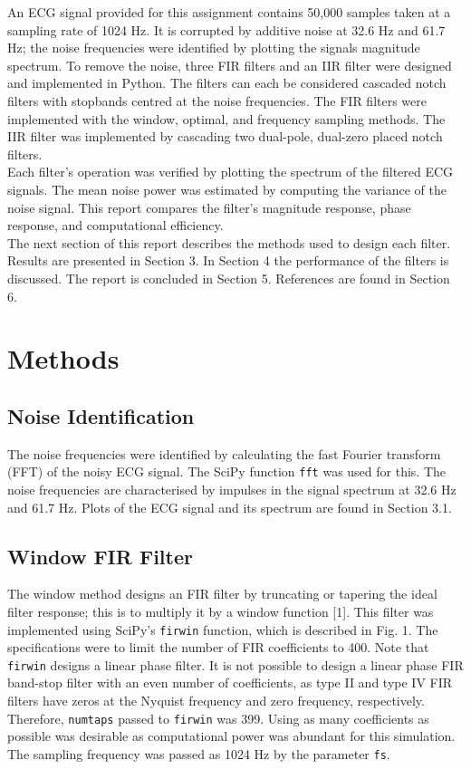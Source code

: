 \documentclass[12pt]{article}
\begin{document}
\noindent An ECG signal provided for this assignment contains 50,000 samples taken at a sampling rate of 1024 Hz. It is corrupted by additive noise
at 32.6 Hz and 61.7 Hz; the noise frequencies were identified by plotting the signals magnitude spectrum. To remove the noise, three FIR
filters and an IIR filter were designed and implemented in Python. The filters can each be considered cascaded notch filters with stopbands
centred at the noise frequencies. The FIR filters were implemented with the window, optimal, and frequency sampling methods. The IIR filter
was implemented by cascading two dual-pole, dual-zero placed notch filters.\\

\noindent Each filter’s operation was verified by plotting the spectrum of the filtered ECG signals. The mean noise power was estimated by computing
the variance of the noise signal. This report compares the filter’s magnitude response, phase response, and computational efficiency.\\

\noindent The next section of this report describes the methods used to design each filter. Results are presented in Section 3. In Section 4 the
performance of the filters is discussed. The report is concluded in Section 5. References are found in Section 6.

\section{Methods}

\subsection{Noise Identification}
The noise frequencies were identified by calculating the fast Fourier transform (FFT) of the noisy ECG signal. The SciPy function \texttt{fft}
was used for this. The noise frequencies are characterised by impulses in the signal spectrum at 32.6 Hz and 61.7 Hz. Plots of the ECG signal
and its spectrum are found in Section 3.1.

\subsection{Window FIR Filter}
The window method designs an FIR filter by truncating or tapering the ideal filter response; this is to multiply it by a window function [1].
This filter was implemented using SciPy’s \texttt{firwin} function, which is described in Fig. 1. The specifications were to limit the number of FIR
coefficients to 400. Note that \texttt{firwin} designs a linear phase filter. It is not possible to design a linear phase FIR band-stop filter with
an even number of coefficients, as type II and type IV FIR filters have zeros at the Nyquist frequency and zero frequency, respectively.
Therefore, \texttt{numtaps} passed to \texttt{firwin} was 399. Using as many coefficients as possible was desirable as computational power was abundant for
this simulation. The sampling frequency was passed as 1024 Hz by the parameter \texttt{fs}.\\
\end{document}
